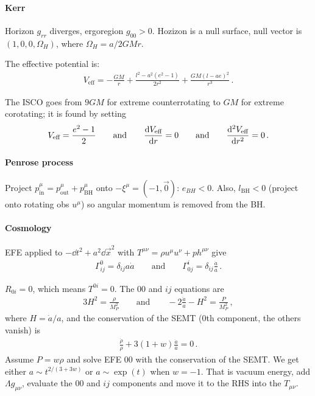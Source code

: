 \documentclass[main.tex]{subfiles}
\begin{document}
\paragraph{Kerr} 

Horizon \(g_{rr}\) diverges, ergoregion \(g_{00} >0\). 
Hozizon is a null surface, null vector is \((1, 0,0,\Omega_{H})\), where \(\Omega_{H} = a / 2GMr\). 

The effective potential is:
\begin{align}
V _{\text{eff}} = - \frac{GM}{r} + \frac{l^2- a^2 (e^2-1)}{2 r^2} 
+ \frac{GM (l - ae)^2}{r^3}
\,.
\end{align}

The ISCO goes from \(9GM\) for extreme counterrotating to \(GM\) for extreme corotating; it is found by setting
%
\begin{align}
V _{\text{eff}} = \frac{e^2-1}{2}
\qquad \text{and} \qquad
\dv{V _{\text{eff}}}{r} = 0
\qquad \text{and} \qquad
\dv[2]{V _{\text{eff}}}{r} = 0
\,.
\end{align}

\paragraph{Penrose process}

Project \(p^{\mu } _{\text{in}} = p^{\mu } _{\text{out}} + p^{\mu } _{\text{BH}} \) onto \(-\xi^{\mu } = (-1, \vec{0})\): \(e_{BH} <0\). Also, \(l _{\text{BH}} <0\) (project onto rotating obs \(u^{\mu }\)) so angular momentum is removed from the BH.

\paragraph{Cosmology}

EFE applied to \(-\dd{t^2} + a^2 \dd{\vec{x}^2}\) with \(T^{\mu \nu }= \rho u^{\mu } u^{\nu } + p h^{\mu \nu }\) give 
%
\begin{align}
\Gamma^{0}_{ij} = \delta_{ij} a \dot{a}
\qquad \text{and} \qquad
\Gamma^{i}_{0j} = \delta_{ij} \frac{\dot{a}}{a}
\,.
\end{align}

\(R_{0i} =0\), which means \(T^{0i} = 0\). The 00 and \(ij\) equations are 
%
\begin{align}
3 H^2 = \frac{\rho}{M_P^2}
\qquad \text{and} \qquad
-2 \frac{\ddot{a}}{a}- H^2 = \frac{P}{M_P^2} 
\,,
\end{align}
%
where \(H = \dot{a} / a \),
and the conservation of the SEMT (0th component, the others vanish) is 
%
\begin{align}
\frac{\dot{\rho}}{\rho } + 3 (1+w) \frac{\dot{a}}{a} =0
\,.
\end{align}
%
Assume \(P = w \rho \) and solve EFE \(00 \) with the conservation of the SEMT. We get either \(a \sim t^{2/(3+3w)}\) or \(a \sim \exp(t)\) when \(w=-1\).
That is vacuum energy, add \(\Lambda g_{\mu \nu }\), evaluate the 00 and \(ij\) components and move it to the RHS into the \(T_{\mu \nu }\).
\end{document}
